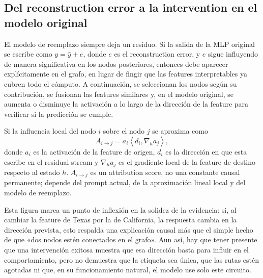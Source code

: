 
\subsection{Del reconstruction error a la intervention en el modelo original}

El modelo de reemplazo siempre deja un residuo. Si la salida de la MLP original se escribe como $y=\hat y+e$, donde $e$ es el reconstruction error, y $e$ sigue influyendo de manera significativa en los nodos posteriores, entonces debe aparecer explícitamente en el grafo, en lugar de fingir que las features interpretables ya cubren todo el cómputo. A continuación, se seleccionan los nodos según su contribución, se fusionan las features similares y, en el modelo original, se aumenta o disminuye la activación a lo largo de la dirección de la feature para verificar si la predicción se cumple.




Si la influencia local del nodo $i$ sobre el nodo $j$ se aproxima como
\[
A_{i\to j}=a_i\left\langle d_i,\nabla_h a_j\right\rangle,
\]
donde $a_i$ es la activación de la feature de origen, $d_i$ es la dirección en que esta escribe en el residual stream y $\nabla_h a_j$ es el gradiente local de la feature de destino respecto al estado $h$. $A_{i\to j}$ es un attribution score, no una constante causal permanente; depende del prompt actual, de la aproximación lineal local y del modelo de reemplazo.


Esta figura marca un punto de inflexión en la solidez de la evidencia: si, al cambiar la feature de Texas por la de California, la respuesta cambia en la dirección prevista, esto respalda una explicación causal más que el simple hecho de que «dos nodos estén conectados en el grafo». Aun así, hay que tener presente que una intervención exitosa muestra que esa dirección basta para influir en el comportamiento, pero no demuestra que la etiqueta sea única, que las rutas estén agotadas ni que, en su funcionamiento natural, el modelo use solo este circuito.

